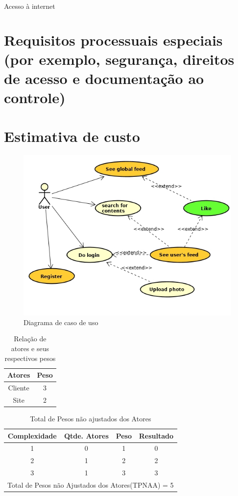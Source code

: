 Acesso à internet

\section{Requisitos processuais especiais (por exemplo, segurança, direitos de acesso e documentação ao controle)}

\pagebreak

\section{Estimativa de custo}

\begin{figure}[ht]
	\centering
	\includegraphics[width=\textwidth]{./imagens/usecase.jpg}
	\caption{Diagrama de caso de uso}
	\label{fig:casoDeUso}
\end{figure}

\begin{table}[!htb]
	\caption[Atores]{Relação de atores e seus respectivos pesos}
	\label{tab:correlacao}
	\centering
	\begin{tabular}{c|c}
		Atores  & Peso 	\\ \hline
		Cliente & 3    	\\
		Site    & 2		\\
	\end{tabular}
\end{table}

\begin{table}[!htb]
	\caption[TPNAA]{Total de Pesos não ajustados dos Atores}
	\label{tab:correlacao}
	\centering
	\begin{tabular}{c|c|c|c}
		Complexidade 		 & Qtde. Atores 			& Peso 		 & Resultado	\\ \hline
		1 					 & 0						&	1		 &	  0 	 	\\
		2 					 & 1						&	2		 &	  2 	 	\\
		3 					 & 1						&	3		 &	  3 	 	\\ \hline
		\multicolumn{4}{l}{Total de Pesos não Ajustados dos Atores(TPNAA) = 5}	 	\\
	\end{tabular}
\end{table}

